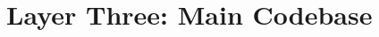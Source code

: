 \documentclass{report}
\makeatletter
\newenvironment{chapquote}[2][2em]
  {\setlength{\@tempdima}{#1}%
   \def\chapquote@author{#2}%
   \parshape 1 \@tempdima \dimexpr\textwidth-2\@tempdima\relax%
   \itshape}
  {\par\normalfont\hfill--\ \chapquote@author\hspace*{\@tempdima}\par\bigskip}
\newcommand{\dstar}{$\star\star$}	%
\makeatother
\begin{document}

\section{Layer Three: Main Codebase}	\label{sec:layer3}
\end{document}
